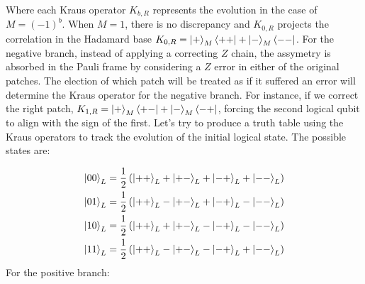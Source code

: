 \documentclass[12pt, twoside, openany]{book}
\begin{document}
Where each Kraus operator $K_{b,R}$ represents the evolution in the case of $M= (-1)^b$. When $M=1$, there is no discrepancy and $K_{0,R}$ projects the correlation in the Hadamard base $K_{0,R} = \ket{+}_M \bra{++} + \ket{-}_M \bra{--}$. For the negative branch, instead of applying a correcting $Z$ chain, the assymetry is absorbed in the Pauli frame by considering a $Z$ error in either of the original patches. The election of which patch will be treated as if it suffered an error will determine the Kraus operator for the negative branch. For instance, if we correct the right patch, $K_{1,R} = \ket{+}_M \bra{+-} + \ket{-}_M \bra{-+}$, forcing the second logical qubit to align with the sign of the first. Let's try to produce a truth table using the Kraus operators to track the evolution of the initial logical state. The possible states are:

\begin{align*}
\ket{00}_L &= \frac{1}{2}\left( \ket{++}_L + \ket{+-}_L + \ket{-+}_L + \ket{--}_L \right) \\
\ket{01}_L &= \frac{1}{2}\left( \ket{++}_L - \ket{+-}_L + \ket{-+}_L - \ket{--}_L \right) \\
\ket{10}_L &= \frac{1}{2}\left( \ket{++}_L + \ket{+-}_L - \ket{-+}_L - \ket{--}_L \right) \\
\ket{11}_L &= \frac{1}{2}\left( \ket{++}_L - \ket{+-}_L - \ket{-+}_L + \ket{--}_L \right)
\end{align*}
For the positive branch:
\end{document}

